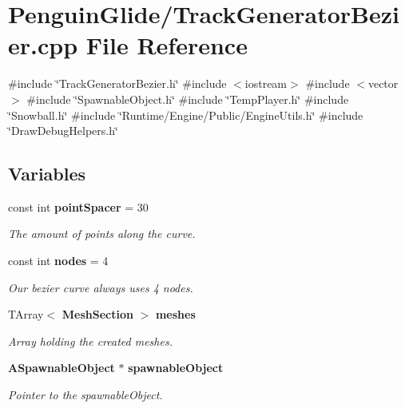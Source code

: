 \section{Penguin\+Glide/\+Track\+Generator\+Bezier.cpp File Reference}
\label{_track_generator_bezier_8cpp}
{\ttfamily \#include \char`\"{}Track\+Generator\+Bezier.\+h\char`\"{}}\newline
{\ttfamily \#include $<$iostream$>$}\newline
{\ttfamily \#include $<$vector$>$}\newline
{\ttfamily \#include \char`\"{}Spawnable\+Object.\+h\char`\"{}}\newline
{\ttfamily \#include \char`\"{}Temp\+Player.\+h\char`\"{}}\newline
{\ttfamily \#include \char`\"{}Snowball.\+h\char`\"{}}\newline
{\ttfamily \#include \char`\"{}Runtime/\+Engine/\+Public/\+Engine\+Utils.\+h\char`\"{}}\newline
{\ttfamily \#include \char`\"{}Draw\+Debug\+Helpers.\+h\char`\"{}}\newline
\subsection*{Variables}
\begin{DoxyCompactItemize}
\item 
const int \textbf{ point\+Spacer} = 30
\begin{DoxyCompactList}\small\item\em The amount of points along the curve. \end{DoxyCompactList}\item 
const int \textbf{ nodes} = 4
\begin{DoxyCompactList}\small\item\em Our bezier curve always uses 4 nodes. \end{DoxyCompactList}\item 
T\+Array$<$ \textbf{ Mesh\+Section} $>$ \textbf{ meshes}
\begin{DoxyCompactList}\small\item\em Array holding the created meshes. \end{DoxyCompactList}\item 
\textbf{ A\+Spawnable\+Object} $\ast$ \textbf{ spawnable\+Object}
\begin{DoxyCompactList}\small\item\em Pointer to the spawnable\+Object. \end{DoxyCompactList}\end{DoxyCompactItemize}



